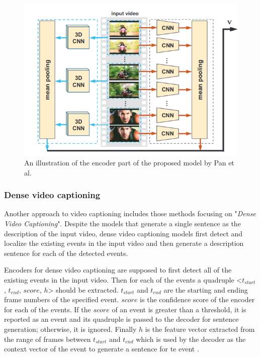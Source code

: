 \documentclass[preprint, 12pt]{elsarticle}
\begin{document}
		\begin{figure}[h]
			\centering
			\includegraphics[scale=0.5]{Imgs/3DCNN2.png}
			\caption{An illustration of the encoder part of the proposed model by Pan et al. \cite{pan2016jointly}}
			\label{fig:3dcnn2}
		\end{figure}
	
		\subsubsection{Dense video captioning}
		Another approach to video captioning includes those methods focusing on "\textit{Dense Video Captioning}". Despite the models that generate a single sentence as the description of the input video, dense video captioning models first detect and localize the existing events in the input video and then generate a description sentence for each of the detected events. 
		
		Encoders for dense video captioning are supposed to first detect all of the existing events in the input video. Then for each of the events a quadruple <$t_{start}$, $t_{end}$, $score$, $h$> should be extracted. $t_{start}$ and $t_{end}$ are the starting and ending frame numbers of the specified event. $score$ is the confidence score of the encoder for each of the events. If the $score$ of an event is greater than a threshold, it is reported as an event and its quadruple is passed to the decoder for sentence generation; otherwise, it is ignored. Finally $h$ is the feature vector extracted from the range of frames between $t_{start}$ and $t_{end}$ which is used by the decoder as the context vector of the event to generate a sentence for te event \cite{li2018jointly}. 
		
\end{document}
